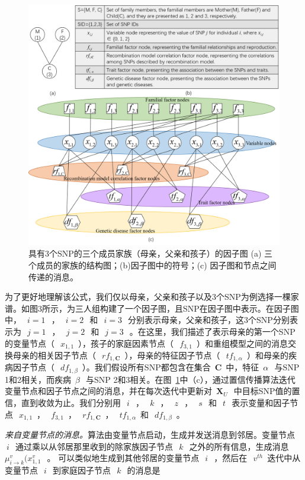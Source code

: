 \begin{figure}[htbp]
	\centering
	\includegraphics[width=0.95\linewidth]{./figures/factor-graph.png}
	\centering
	\caption{具有3个SNP的三个成员家族（母亲，父亲和孩子）的因子图 (a) 三个成员的家族的结构图；(b)因子图中的符号；(c) 因子图和节点之间传递的消息。}\label{fig:factor-graph}
\end{figure}

为了更好地理解该公式，我们仅以母亲，父亲和孩子以及3个SNP为例选择一棵家谱。如图3所示，为三人组构建了一个因子图，且SNP在因子图中表示。在因子图中，~$~i=1~$~，~$~i=2~$~和~$~i=3~$~分别表示母亲，父亲和孩子，这3个SNP分别表示为~$~j=1~$~，~$~j=2~$~和~$~j=3~$~。在这里，我们描述了表示母亲的第一个SNP的变量节点（~$~x_{1,1}$~），孩子的家庭因素节点（~$~f_{3,1}$~）和重组模型之间的消息交换母亲的相关因子节点（~$~rf_{1,\mathbf{C}}$~），母亲的特征因子节点（~$~tf_{1,\alpha}$~）和母亲的疾病因子节点（~$~df_{1,\beta}$~）。我们假设所有SNP都包含在集合~$\mathbf{C}$~中，特征~$\alpha~$~与SNP 1和2相关，而疾病~$\beta~$~与SNP 2和3相关。在图~\ref{fig:factor-graph}中（c），通过置信传播算法迭代变量节点和因子节点之间的消息，并在每次迭代中更新对~$\mathbf{X}_U~$~中目标SNP值的置信，直到收敛为止。我们分别用~$~i~$~，~$~k~$~，~$~z~$~，~$~s~$~和~$~t~$~表示变量和因子节点~$~x_{1,1}$~，~$~f_{3,1}$~，~$~rf_{1,\mathbf{C}}$~，~$~tf_{1,\alpha}$~和~$~df_{1,\beta}$~。


\emph{来自变量节点的消息。}算法由变量节点启动，生成并发送消息到邻居。变量节点~$~i~$~通过乘以从邻居那里收到的除家族因子节点~$~k~$~之外的所有信息，生成消息~$\mu_{i \rightarrow k}^v(x_{1,1}^v~$~。 可以类似地生成到其他邻居的变量节点~$~i~$~，然后在~$~v^{th}$~迭代中从变量节点~$~i~$~到家庭因子节点~$~k~$~的消息是

